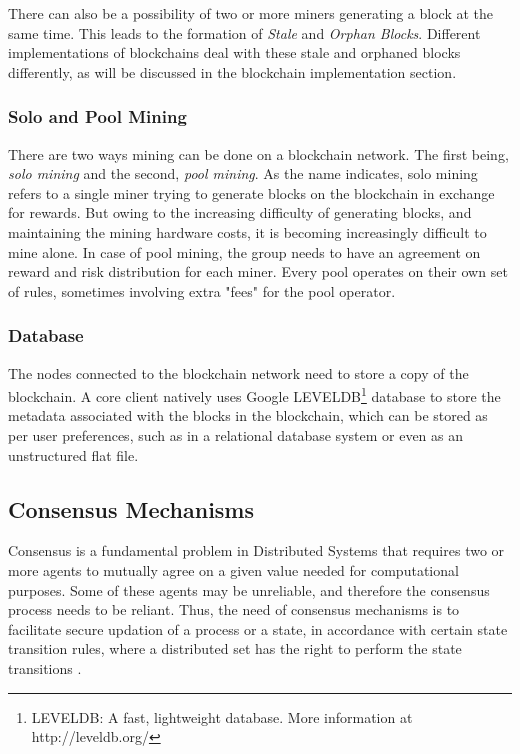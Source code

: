 \documentclass[english]{tktltiki}
\begin{document}
There can also be a possibility of two or more miners generating a block at the same time. This leads to the formation of \textit{Stale} and \textit{Orphan Blocks}. Different implementations of blockchains deal with these stale and orphaned blocks differently, as will be discussed in the blockchain implementation section.

\subsubsection*{Solo and Pool Mining}

There are two ways mining can be done on a blockchain network. The first being, \textit{solo mining} and the second, \textit{pool mining}. As the name indicates, solo mining refers to a single miner trying to generate blocks on the blockchain in exchange for rewards. But owing to the increasing difficulty of generating blocks, and maintaining the mining hardware costs, it is becoming increasingly difficult to mine alone. In case of pool mining, the group needs to have an agreement on reward and risk distribution for each miner. Every pool operates on their own set of rules, sometimes involving extra "fees" for the pool operator. 

\subsubsection{Database}
The nodes connected to the blockchain network need to store a copy of the blockchain. A core client natively uses Google LEVELDB\footnote{LEVELDB: A fast, lightweight database. More information at http://leveldb.org/} database to store the metadata associated with the blocks in the blockchain, which can be stored as per user preferences, such as in a relational database system or even as an unstructured flat file.

\subsection{Consensus Mechanisms}

Consensus is a fundamental problem in Distributed Systems that requires two or more agents to mutually agree on a given value needed for computational purposes. Some of these agents may be unreliable, and therefore the consensus process needs to be reliant. Thus, the need of consensus mechanisms is to facilitate secure updation of a process or a state, in accordance with certain state transition rules, where a distributed set has the right to perform the state transitions \cite{eth-whitepaper}.
\end{document}
